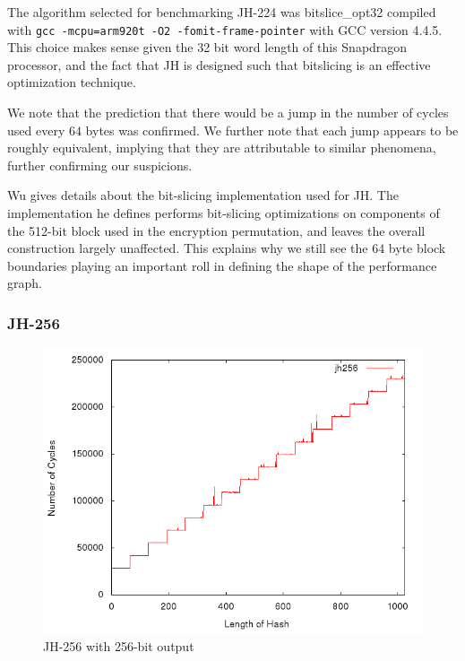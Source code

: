 The algorithm selected for benchmarking JH-224 was bitslice\_opt32 compiled with
\texttt{gcc -mcpu=arm920t -O2 -fomit-frame-pointer} with GCC version 4.4.5. This
choice makes sense given the 32 bit word length of this Snapdragon processor,
and the fact that JH is designed such that bitslicing is an effective
optimization technique\cite{wu2008jh}. 

We note that the prediction that there would be a jump in the number of cycles
used every $64$ bytes was confirmed. We further note that each jump appears to
be roughly equivalent, implying that they are attributable to similar phenomena,
further confirming our suspicions. 

Wu\cite{wu2008jh} gives details about the bit-slicing implementation used for
JH. The implementation he defines performs bit-slicing optimizations on
components of the 512-bit block used in the encryption permutation, and leaves
the overall construction largely unaffected. This explains why we still see the
$64$ byte block boundaries playing an important roll in defining the shape of
the performance graph.


\subsubsection{JH-256}
\begin{figure}[H]
    \begin{center}
        \includegraphics[scale=0.5]{images/jh256.png} 
        \caption{JH-256 with 256-bit output}
    \end{center}
\end{figure}

